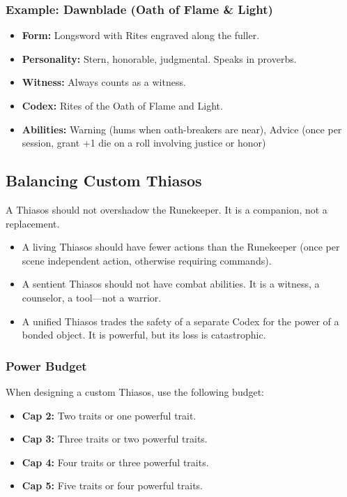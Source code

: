 \subsubsection{Example: Dawnblade (Oath of Flame \& Light)}

\begin{itemize}
\item \textbf{Form:} Longsword with Rites engraved along the fuller.
\item \textbf{Personality:} Stern, honorable, judgmental. Speaks in proverbs.
\item \textbf{Witness:} Always counts as a witness.
\item \textbf{Codex:} Rites of the Oath of Flame and Light.
\item \textbf{Abilities:} Warning (hums when oath-breakers are near), Advice (once per session, grant +1 die on a roll involving justice or honor)
\end{itemize}

\subsection{Balancing Custom Thiasos}

A Thiasos should not overshadow the Runekeeper. It is a companion, not a replacement.

\begin{itemize}
\item A living Thiasos should have fewer actions than the Runekeeper (once per scene independent action, otherwise requiring commands).
\item A sentient Thiasos should not have combat abilities. It is a witness, a counselor, a tool—not a warrior.
\item A unified Thiasos trades the safety of a separate Codex for the power of a bonded object. It is powerful, but its loss is catastrophic.
\end{itemize}

\subsubsection{Power Budget}

When designing a custom Thiasos, use the following budget:

\begin{itemize}
\item \textbf{Cap 2:} Two traits or one powerful trait.
\item \textbf{Cap 3:} Three traits or two powerful traits.
\item \textbf{Cap 4:} Four traits or three powerful traits.
\item \textbf{Cap 5:} Five traits or four powerful traits.
\end{itemize}

